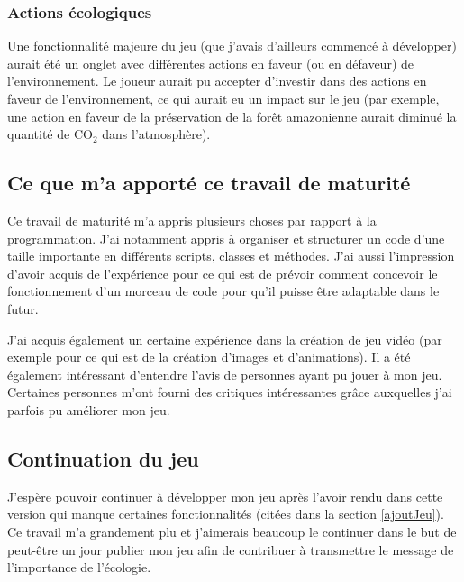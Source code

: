 \documentclass{article}
\begin{document}
		\subsubsection{Actions écologiques}
		Une fonctionnalité majeure du jeu (que j'avais d'ailleurs commencé à développer) aurait été un onglet avec différentes actions en faveur (ou en défaveur) de l'environnement. Le joueur aurait pu accepter d'investir dans des actions en faveur de l'environnement, ce qui aurait eu un impact sur le jeu (par exemple, une action en faveur de la préservation de la forêt amazonienne aurait diminué la quantité de CO$_{2}$ dans l'atmosphère).

				
		\subsection{Ce que m'a apporté ce travail de maturité}
		Ce travail de maturité m'a appris plusieurs choses par rapport à la programmation. J'ai notamment appris à organiser et structurer un code d'une taille importante en différents scripts, classes et méthodes. J'ai aussi l'impression d'avoir acquis de l'expérience pour ce qui est de prévoir comment concevoir le fonctionnement d'un morceau de code pour qu'il puisse être adaptable dans le futur.
		
		
		J'ai acquis également un certaine expérience dans la création de jeu vidéo (par exemple pour ce qui est de la création d'images et d'animations). Il a été également intéressant d'entendre l'avis de personnes ayant pu jouer à mon jeu. Certaines personnes m'ont fourni des critiques intéressantes grâce auxquelles j'ai parfois pu améliorer mon jeu.
		
		\subsection{Continuation du jeu}
		J'espère pouvoir continuer à développer mon jeu après l'avoir rendu dans cette version qui manque certaines fonctionnalités (citées dans la section \ref{ajoutJeu}). Ce travail m'a grandement plu et j'aimerais beaucoup le continuer dans le but de peut-être un jour publier mon jeu afin de contribuer à transmettre le message de l'importance de l'écologie.
        
\end{document}
